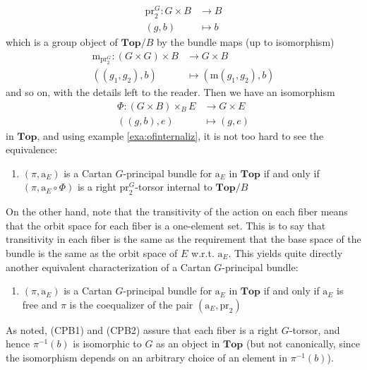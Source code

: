 \begin{exa}[Bundles 2]
\begin{align*}
  \mathrm{pr}_{2}^{G}
  \colon
  G
  \times
  B
  &\rightarrow
  B
  \\
  (g,b)
  &\mapsto
  b
\end{align*}
which is a group object of $\mathbf{Top} \slash B$ by the bundle maps (up to isomorphism)
\begin{align*}
  \mathrm{m}_{\mathrm{pr}_{2}^{G}}
  \colon
  \left(
    G
    \times
    G
  \right)
  \times
  B
  &\rightarrow
  G
  \times
  B
  \\
  ((g_{1},g_{2}),b)
  &\mapsto
  \left(
    \mathrm{m}(g_{1},g_{2}),
    b
  \right)
\end{align*}
and so on, with the details left to the reader.
Then we have an isomorphism
\begin{align*}
  \Phi
  \colon
  \left(
    G
    \times
    B
  \right)
  \times_{B}
  E
  &\rightarrow
  G
  \times
  E
  \\
  ((g,b),e)
  &\mapsto
  (g,e)
\end{align*}
in $\mathbf{Top}$, and using example \ref{exa:ofinternaliz}, it is not too hard to see the equivalence:
\begin{enumerate}
\item[($\equiv_{1}$)]
$(\pi,\mathrm{a}_{E})$ is a Cartan $G$-principal bundle for $\mathrm{a}_{E}$ in $\mathbf{Top}$ if and only if $(\pi,\mathrm{a}_{E} \circ \Phi)$ is a right $\mathrm{pr}_{2}^{G}$-torsor internal to $\mathbf{Top} \slash B$
\end{enumerate}
On the other hand, note that the transitivity of the action on each fiber means that the orbit space for each fiber is a one-element set.
This is to say that transitivity in each fiber is the same as the requirement that the base space of the bundle is the same as the orbit space of $E$ w.r.t. $\mathrm{a}_{E}$.
This yields quite directly another equivalent characterization of a Cartan $G$-principal bundle:
\begin{enumerate}
\item[($\equiv_{2}$)]
$(\pi,\mathrm{a}_{E})$ is a Cartan $G$-principal bundle for $\mathrm{a}_{E}$ in $\mathbf{Top}$ if and only if $\mathrm{a}_{E}$ is free and $\pi$ is the coequalizer of the pair $(\mathrm{a}_{E},\mathrm{pr}_{2})$
\end{enumerate}
As noted, (CPB1) and (CPB2) assure that each fiber is a right $G$-torsor, and hence $\pi^{-1}(b)$ is isomorphic to $G$ as an object in $\mathbf{Top}$ (but not canonically, since the isomorphism depends on an arbitrary choice of an element in $\pi^{-1}(b)$).

\end{exa}
